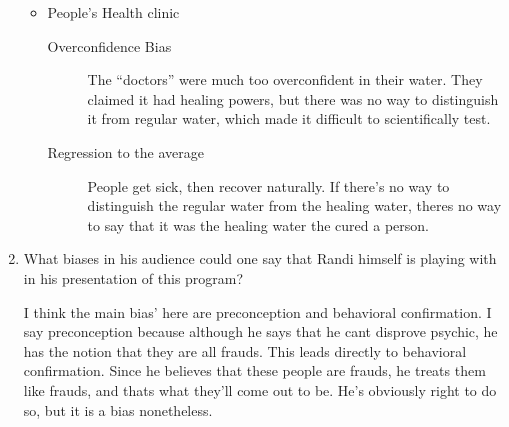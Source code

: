 \documentclass[10pt, a4paper]{article}
\begin{document}
\begin{enumerate}
\begin{itemize}
      \item People's Health clinic
        \begin{description}
          \item[Overconfidence Bias] The ``doctors'' were much too overconfident in their water. They claimed it had healing powers, but there was no way to distinguish it from regular water, which made it difficult to scientifically test.
          \item[Regression to the average] People get sick, then recover naturally. If there's no way to distinguish the regular water from the healing water, theres no way to say that it was the healing water the cured a person.
        \end{description}
    \end{itemize}

  \item What biases in his audience could one say that Randi himself is playing with in his presentation of this program?

    I think the main bias' here are preconception and behavioral confirmation. I say preconception because although he says that he cant disprove psychic, he has the notion that they are all frauds. This leads directly to behavioral confirmation. Since he believes that these people are frauds, he treats them like frauds, and thats what they'll come out to be. He's obviously right to do so, but it is a bias nonetheless. 


\end{enumerate}
\end{document}
